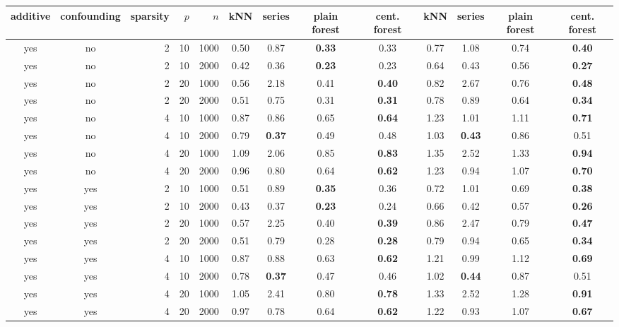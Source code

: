 \begin{table}[ht]
\centering
\begin{tabular}{||cc|rrr||cccc|cccc||}
  \hline
\hline
additive & confounding & sparsity & $p$ & $n$ & kNN & series & plain forest & cent. forest & kNN & series & plain forest & cent. forest \\ 
  \hline
\hline
yes & no & 2 & 10 & 1000 & 0.50 & 0.87 & \bf 0.33 & 0.33 & 0.77 & 1.08 & 0.74 & \bf 0.40 \\ 
  yes & no & 2 & 10 & 2000 & 0.42 & 0.36 & \bf 0.23 & 0.23 & 0.64 & 0.43 & 0.56 & \bf 0.27 \\ 
  yes & no & 2 & 20 & 1000 & 0.56 & 2.18 & 0.41 & \bf 0.40 & 0.82 & 2.67 & 0.76 & \bf 0.48 \\ 
  yes & no & 2 & 20 & 2000 & 0.51 & 0.75 & 0.31 & \bf 0.31 & 0.78 & 0.89 & 0.64 & \bf 0.34 \\ 
   \hline
yes & no & 4 & 10 & 1000 & 0.87 & 0.86 & 0.65 & \bf 0.64 & 1.23 & 1.01 & 1.11 & \bf 0.71 \\ 
  yes & no & 4 & 10 & 2000 & 0.79 & \bf 0.37 & 0.49 & 0.48 & 1.03 & \bf 0.43 & 0.86 & 0.51 \\ 
  yes & no & 4 & 20 & 1000 & 1.09 & 2.06 & 0.85 & \bf 0.83 & 1.35 & 2.52 & 1.33 & \bf 0.94 \\ 
  yes & no & 4 & 20 & 2000 & 0.96 & 0.80 & 0.64 & \bf 0.62 & 1.23 & 0.94 & 1.07 & \bf 0.70 \\ 
   \hline
yes & yes & 2 & 10 & 1000 & 0.51 & 0.89 & \bf 0.35 & 0.36 & 0.72 & 1.01 & 0.69 & \bf 0.38 \\ 
  yes & yes & 2 & 10 & 2000 & 0.43 & 0.37 & \bf 0.23 & 0.24 & 0.66 & 0.42 & 0.57 & \bf 0.26 \\ 
  yes & yes & 2 & 20 & 1000 & 0.57 & 2.25 & 0.40 & \bf 0.39 & 0.86 & 2.47 & 0.79 & \bf 0.47 \\ 
  yes & yes & 2 & 20 & 2000 & 0.51 & 0.79 & 0.28 & \bf 0.28 & 0.79 & 0.94 & 0.65 & \bf 0.34 \\ 
   \hline
yes & yes & 4 & 10 & 1000 & 0.87 & 0.88 & 0.63 & \bf 0.62 & 1.21 & 0.99 & 1.12 & \bf 0.69 \\ 
  yes & yes & 4 & 10 & 2000 & 0.78 & \bf 0.37 & 0.47 & 0.46 & 1.02 & \bf 0.44 & 0.87 & 0.51 \\ 
  yes & yes & 4 & 20 & 1000 & 1.05 & 2.41 & 0.80 & \bf 0.78 & 1.33 & 2.52 & 1.28 & \bf 0.91 \\ 
  yes & yes & 4 & 20 & 2000 & 0.97 & 0.78 & 0.64 & \bf 0.62 & 1.22 & 0.93 & 1.07 & \bf 0.67 \\ 

\end{tabular}
\end{table}

